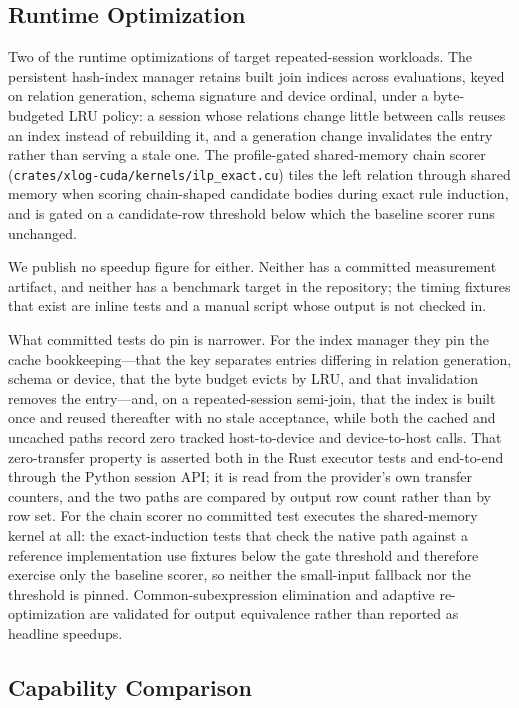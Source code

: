 \subsection{Runtime Optimization}\label{sec:runtime-eval}

Two of the runtime optimizations of  target repeated-session workloads. The persistent hash-index manager retains built join indices across evaluations, keyed on relation generation, schema signature and device ordinal, under a byte-budgeted LRU policy: a session whose relations change little between calls reuses an index instead of rebuilding it, and a generation change invalidates the entry rather than serving a stale one. The profile-gated shared-memory chain scorer (\texttt{crates/xlog-cuda/kernels/}\allowbreak\texttt{ilp\_exact.cu}) tiles the left relation through shared memory when scoring chain-shaped candidate bodies during exact rule induction, and is gated on a candidate-row threshold below which the baseline scorer runs unchanged.

We publish no speedup figure for either. Neither has a committed measurement artifact, and neither has a benchmark target in the repository; the timing fixtures that exist are inline tests and a manual script whose output is not checked in.

What committed tests do pin is narrower. For the index manager they pin the cache bookkeeping---that the key separates entries differing in relation generation, schema or device, that the byte budget evicts by LRU, and that invalidation removes the entry---and, on a repeated-session semi-join, that the index is built once and reused thereafter with no stale acceptance, while both the cached and uncached paths record zero tracked host-to-device and device-to-host calls. That zero-transfer property is asserted both in the Rust executor tests and end-to-end through the Python session API; it is read from the provider's own transfer counters, and the two paths are compared by output row count rather than by row set. For the chain scorer no committed test executes the shared-memory kernel at all: the exact-induction tests that check the native path against a reference implementation use fixtures below the gate threshold and therefore exercise only the baseline scorer, so neither the small-input fallback nor the threshold is pinned. Common-subexpression elimination and adaptive re-optimization are validated for output equivalence rather than reported as headline speedups.

\subsection{Capability Comparison}

